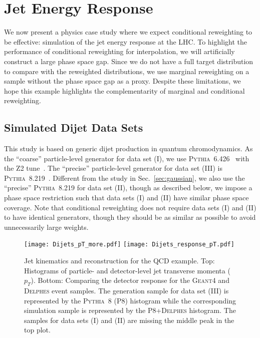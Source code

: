 \documentclass[aps,prx,reprint,preprintnumbers,superscriptaddress,nofootinbib,longbibliography,floatfix]{revtex4-2}
\DeclareRobustCommand{\Sec}[1]{Sec.~\ref{sec:#1}}
\begin{document}
\section{Jet Energy Response}
\label{sec:jer}

We now present a physics case study where we expect conditional reweighting to be effective: simulation of the jet energy response at the LHC.
%
To highlight the performance of conditional reweighting for interpolation, we will artificially construct a large phase space gap.
%
Since we do not have a full target distribution to compare with the reweighted distributions, we use marginal reweighting on a sample without the phase space gap as a proxy.
%
Despite these limitations, we hope this example highlights the complementarity of marginal and conditional reweighting.


\subsection{Simulated Dijet Data Sets}




This study is based on generic dijet production in quantum chromodynamics.
%
As the ``coarse'' particle-level generator for data set (I), we use \textsc{Pythia}~6.426~\cite{Sjostrand:2006za} with the Z2 tune~\cite{Chatrchyan:2011id}.
%
The ``precise'' particle-level generator for data set (III) is \textsc{Pythia}~8.219~\cite{Sjostrand:2007gs}.
%
Different from the study in \Sec{gaussian}, we also use the ``precise'' \textsc{Pythia}~8.219 for data set (II), though as described below, we impose a phase space restriction such that data sets (I) and (II) have similar phase space coverage.
%
Note that conditional reweighting does not require data sets (I) and (II) to have identical generators, though they should be as similar as possible to avoid unnecessarily large weights.

\begin{figure}[t]
    \centering
    \texttt{[image: Dijets\_pT\_more.pdf]}
     \texttt{[image: Dijets\_response\_pT.pdf]}
    \caption{
    Jet kinematics and reconstruction for the QCD example.
    Top: Histograms of particle- and detector-level jet transverse momenta ($p_T$).
    Bottom: Comparing the detector response for the \textsc{Geant4} and \textsc{Delphes} event samples.
    The generation sample for data set (III) is represented by the \textsc{Pythia}~8 (P8) histogram while the corresponding simulation sample is represented by the P8+\textsc{Delphes} histogram.
    The samples for data sets (I) and (II) are missing the middle peak in the top plot.}
    \label{fig:dijet}
\end{figure}
\end{document}
